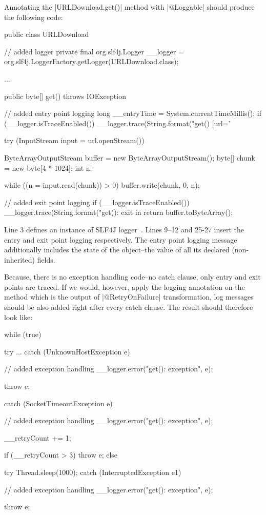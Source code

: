 Annotating the \javainline|URLDownload.get()| method with \javainline|@Loggable| should produce the following code:
%
\begin{javacode}
public class URLDownload {
  // added logger
  private final org.slf4j.Logger __logger = org.slf4j.LoggerFactory.getLogger(URLDownload.class);

  ...

  public byte[] get() throws IOException {
    // added entry point logging
    long __entryTime = System.currentTimeMillis();
    if (__logger.isTraceEnabled()) {
      __logger.trace(String.format("get() [url='%
    }

    try (InputStream input = url.openStream()) {

      ByteArrayOutputStream buffer = new ByteArrayOutputStream();
      byte[] chunk = new byte[4 * 1024];
      int n;

      while ((n = input.read(chunk)) > 0) {
        buffer.write(chunk, 0, n);
      }

      // added exit point logging
      if (__logger.isTraceEnabled()) {
        __logger.trace(String.format("get(): exit in %
      }
      return buffer.toByteArray();
    }
  }
}
\end{javacode}

Line 3 defines an instance of SLF4J logger~\cite{slf4j}.
Lines 9--12 and 25-27 insert the entry and exit point logging respectively.
The entry point logging message additionally includes the state of the object--\Ie the value of all its declared (non-inherited) fields.

Because, there is no exception handling code--\Ie no catch clause, only entry and exit points are traced.
If we would, however, apply the logging annotation on the method which is the output of \javainline|@RetryOnFailure| transformation, log messages should be also added right after every catch clause.
The result should therefore look like:
%
\begin{javacode}
while (true) {
  try {
    ...
  } catch (UnknownHostException e) {
    // added exception handling
    __logger.error("get(): exception", e);

    throw e;
  } catch (SocketTimeoutException e) {
    // added exception handling
    __logger.error("get(): exception", e);

    __retryCount += 1;

    if (__retryCount > 3) {
      throw e;
    } else {
      try {
        Thread.sleep(1000);
      } catch (InterruptedException e1) {
        // added exception handling
        __logger.error("get(): exception", e);

        throw e;
      }
    }
  }
}
\end{javacode}

